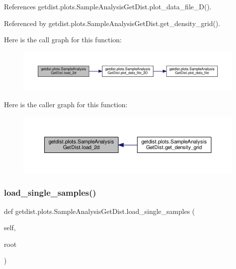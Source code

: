 References getdist.\+plots.\+Sample\+Analysis\+Get\+Dist.\+plot\+\_\+data\+\_\+file\+\_\+D().



Referenced by getdist.\+plots.\+Sample\+Analysis\+Get\+Dist.\+get\+\_\+density\+\_\+grid().

Here is the call graph for this function\+:
\nopagebreak
\begin{figure}[H]
\begin{center}
\leavevmode
\includegraphics[width=350pt]{classgetdist_1_1plots_1_1SampleAnalysisGetDist_a5c17cd9e2e043ccaaced32d01f4f42f8_cgraph}
\end{center}
\end{figure}
Here is the caller graph for this function\+:
\nopagebreak
\begin{figure}[H]
\begin{center}
\leavevmode
\includegraphics[width=350pt]{classgetdist_1_1plots_1_1SampleAnalysisGetDist_a5c17cd9e2e043ccaaced32d01f4f42f8_icgraph}
\end{center}
\end{figure}
\mbox{\label{classgetdist_1_1plots_1_1SampleAnalysisGetDist_a4ff28c8ef05818d493ca2242a320cb43}} 
\subsubsection{\texorpdfstring{load\+\_\+single\+\_\+samples()}{load\_single\_samples()}}
{\footnotesize\ttfamily def getdist.\+plots.\+Sample\+Analysis\+Get\+Dist.\+load\+\_\+single\+\_\+samples (\begin{DoxyParamCaption}\item[{}]{self,  }\item[{}]{root }\end{DoxyParamCaption})}



